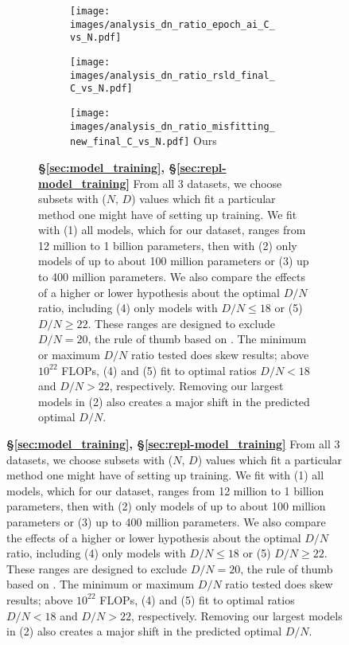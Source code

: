 \begin{figure}[]
\ContinuedFloat
\centering 


\begin{subfigure}{\textwidth}
\begin{subfigure}{0.49\textwidth}
    \centering
    \texttt{[image: images/analysis\_dn\_ratio\_epoch\_ai\_C\_vs\_N.pdf]}
    \footnotesize{\citet{hoffmann2022training,besiroglu2024chinchilla}}
    \label{fig:analysis_form_epoch}
\end{subfigure}
\hfill
\begin{subfigure}{0.49\textwidth}
    \centering
    \texttt{[image: images/analysis\_dn\_ratio\_rsld\_final\_C\_vs\_N.pdf]}
    \footnotesize{\citet{porian2024resolving}}

    \label{fig:analysis_form_ours}
\end{subfigure}
\vspace{1em}
    \centering
\begin{subfigure}{0.49\textwidth}
    \centering
    \texttt{[image: images/analysis\_dn\_ratio\_misfitting\_new\_final\_C\_vs\_N.pdf]}
    \footnotesize{Ours}
    \label{fig:analysis_form_ours}
\end{subfigure}
\vspace{1em}

    \caption{\textbf{\S\ref{sec:model_training}, \S\ref{sec:repl-model_training}} From all 3 datasets, we choose subsets with ($N$, $D$) values which fit a particular method one might have of setting up training. We fit with (1) all models, which for our dataset, ranges from 12 million to 1 billion parameters, then with (2) only models of up to about 100 million parameters or (3) up to 400 million parameters. We also compare the effects of a higher or lower hypothesis about the optimal $D/N$ ratio, including (4) only models with $D/N \leq 18$ or (5) $D/N \geq 22$. These ranges are designed to exclude $D/N = 20$, the rule of thumb based on \citet{hoffmann2022training}. The minimum or maximum $D/N$ ratio tested does skew results; above $10^{22}$ FLOPs, (4) and (5) fit to optimal ratios $D/N < 18$ and $D/N > 22$, respectively. Removing our largest models in (2) also creates a major shift in the predicted optimal $D/N$.}
    \label{fig:analysis_nd_ours}
\end{subfigure}


\end{figure}
